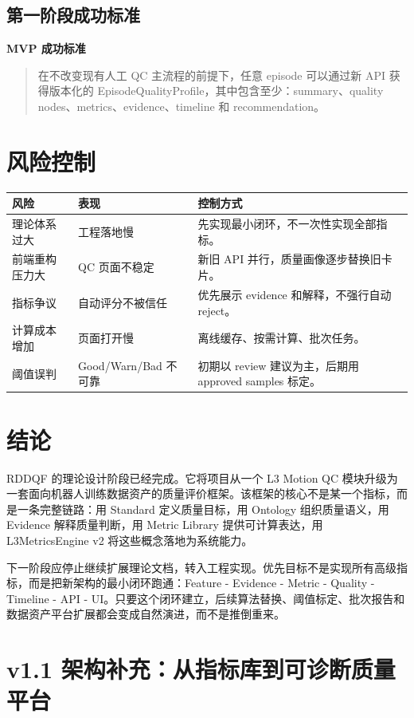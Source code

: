 \documentclass[UTF8,zihao=-4,oneside,openany]{ctexrep}
\newenvironment{greenbox}[1]{\vspace{0.5em}\noindent\colorbox{PassGreen!10}{\parbox{0.96\linewidth}{\textbf{#1}}}\par\vspace{-0.2em}\begin{quote}\small}{\end{quote}\vspace{0.3em}}
\begin{document}
\subsection{第一阶段成功标准}

\begin{greenbox}{MVP 成功标准}
在不改变现有人工 QC 主流程的前提下，任意 episode 可以通过新 API 获得版本化的 EpisodeQualityProfile，其中包含至少：summary、quality nodes、metrics、evidence、timeline 和 recommendation。
\end{greenbox}

\section{风险控制}

\begin{longtable}{L{4cm} L{4cm} L{5.8cm}}
\toprule
风险 & 表现 & 控制方式 \\
\midrule
理论体系过大 & 工程落地慢 & 先实现最小闭环，不一次性实现全部指标。 \\
前端重构压力大 & QC 页面不稳定 & 新旧 API 并行，质量画像逐步替换旧卡片。 \\
指标争议 & 自动评分不被信任 & 优先展示 evidence 和解释，不强行自动 reject。 \\
计算成本增加 & 页面打开慢 & 离线缓存、按需计算、批次任务。 \\
阈值误判 & Good/Warn/Bad 不可靠 & 初期以 review 建议为主，后期用 approved samples 标定。 \\
\bottomrule
\end{longtable}

\section{结论}

RDDQF 的理论设计阶段已经完成。它将项目从一个 L3 Motion QC 模块升级为一套面向机器人训练数据资产的质量评价框架。该框架的核心不是某一个指标，而是一条完整链路：用 Standard 定义质量目标，用 Ontology 组织质量语义，用 Evidence 解释质量判断，用 Metric Library 提供可计算表达，用 L3MetricsEngine v2 将这些概念落地为系统能力。

下一阶段应停止继续扩展理论文档，转入工程实现。优先目标不是实现所有高级指标，而是把新架构的最小闭环跑通：Feature - Evidence - Metric - Quality - Timeline - API - UI。只要这个闭环建立，后续算法替换、阈值标定、批次报告和数据资产平台扩展都会变成自然演进，而不是推倒重来。


\newpage
\section*{v1.1 架构补充：从指标库到可诊断质量平台}
\end{document}
